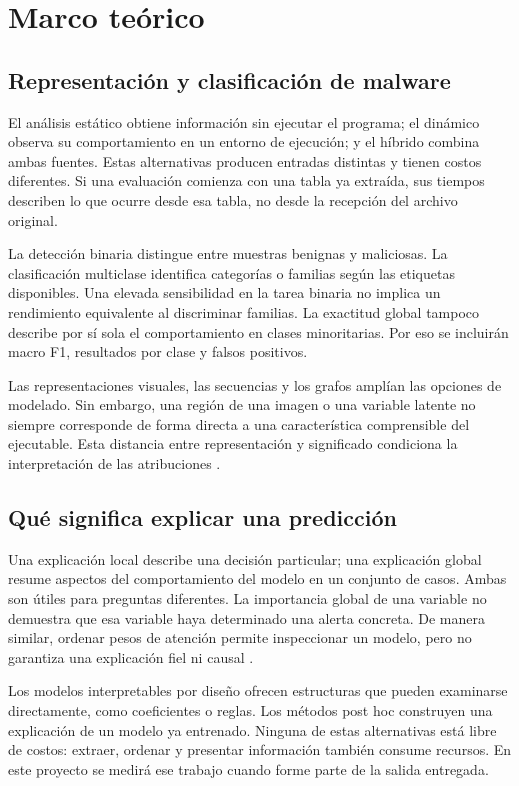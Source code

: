 \chapter{Marco teórico}
\section{Representación y clasificación de malware}
El análisis estático obtiene información sin ejecutar el programa; el dinámico observa su comportamiento en un entorno de ejecución; y el híbrido combina ambas fuentes. Estas alternativas producen entradas distintas y tienen costos diferentes. Si una evaluación comienza con una tabla ya extraída, sus tiempos describen lo que ocurre desde esa tabla, no desde la recepción del archivo original.

La detección binaria distingue entre muestras benignas y maliciosas. La clasificación multiclase identifica categorías o familias según las etiquetas disponibles. Una elevada sensibilidad en la tarea binaria no implica un rendimiento equivalente al discriminar familias. La exactitud global tampoco describe por sí sola el comportamiento en clases minoritarias. Por eso se incluirán macro F1, resultados por clase y falsos positivos.

Las representaciones visuales, las secuencias y los grafos amplían las opciones de modelado. Sin embargo, una región de una imagen o una variable latente no siempre corresponde de forma directa a una característica comprensible del ejecutable. Esta distancia entre representación y significado condiciona la interpretación de las atribuciones \parencite{Ullah2022BERT,Kim2026FCG}.

\section{Qué significa explicar una predicción}
Una explicación local describe una decisión particular; una explicación global resume aspectos del comportamiento del modelo en un conjunto de casos. Ambas son útiles para preguntas diferentes. La importancia global de una variable no demuestra que esa variable haya determinado una alerta concreta. De manera similar, ordenar pesos de atención permite inspeccionar un modelo, pero no garantiza una explicación fiel ni causal \parencite{Liu2025GlassBox,Tayari2026Clarity}.

Los modelos interpretables por diseño ofrecen estructuras que pueden examinarse directamente, como coeficientes o reglas. Los métodos post hoc construyen una explicación de un modelo ya entrenado. Ninguna de estas alternativas está libre de costos: extraer, ordenar y presentar información también consume recursos. En este proyecto se medirá ese trabajo cuando forme parte de la salida entregada.

